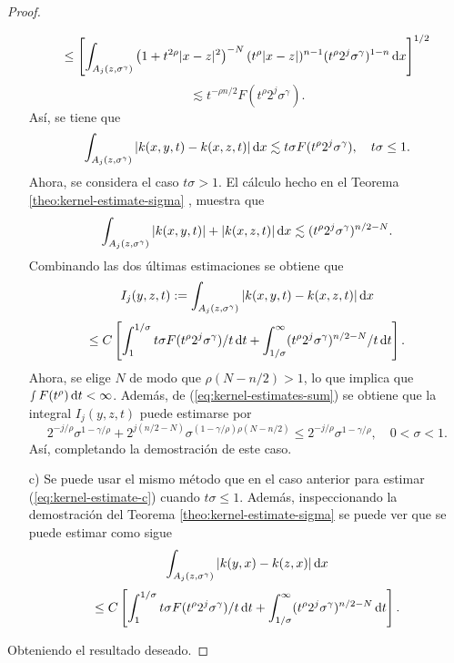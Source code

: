 \begin{proof}
\begin{itemize}
\begin{equation*}
			\leq \left[ \int_{A_j(z, \sigma^\gamma)} \left(1 + t^{2\rho} |x-z|^2\right)^{-N} (t^\rho|x-z|)^{n-1} (t^\rho 2^j \sigma^\gamma)^{1-n} \mathop{}\!\mathrm{d} x  \right]^{1/2}
		\end{equation*}
		\begin{equation*}
			\lesssim t^{-\rho n/2} F(t^\rho2^j\sigma^\gamma).
		\end{equation*}
		Así, se tiene que 
		\begin{equation*}
			\int_{A_j(z, \sigma^\gamma)} |k(x, y, t) - k(x, z, t)| \mathop{}\!\mathrm{d} x \lesssim t\sigma F(t^\rho 2^j\sigma^\gamma), \quad t\sigma \leq 1.
		\end{equation*}
		Ahora, se considera el caso $t\sigma>1$. El cálculo hecho en el Teorema \ref{theo:kernel-estimate-sigma} , muestra que 
		\begin{equation*}
			\int_{A_j(z, \sigma^\gamma)} |k(x, y, t)| + |k(x, z, t)| \mathop{}\!\mathrm{d} x \lesssim (t^\rho 2^j \sigma^\gamma )^{n/2 - N}.
		\end{equation*} 
		Combinando las dos últimas estimaciones se obtiene que 
		\begin{equation*}
			I_{j}(y, z, t) := \int_{A_j(z, \sigma^\gamma)} |k(x, y, t)-k(x, z, t)| \mathop{}\!\mathrm{d} x 
		\end{equation*}
		\begin{equation}
			\leq 
			C \left[  \int_1^{1/\sigma} t\sigma F(t^\rho 2^j \sigma^\gamma )/t\mathop{}\!\mathrm{d} t + \int_{1/\sigma}^\infty (t^\rho 2^j \sigma^\gamma )^{n/2 - N}/t \mathop{}\!\mathrm{d} t \right].
			\label{eq:kernel-estimates-sum}
		\end{equation}
		Ahora, se elige $N$ de modo que $\rho(N-n/2)>1$, lo que implica que $\smallint F(t^\rho)\mathop{}\!\mathrm{d} t < \infty$. Además, de (\ref{eq:kernel-estimates-sum}) se obtiene que la integral $I_j(y, z, t)$ puede estimarse por
		\begin{equation*}
			  2^{-j/\rho} \sigma^{1-\gamma/\rho} + 2^{j(n/2 -N)} \sigma^{(1-\gamma/\rho)\rho(N-n/2)} 
			  \leq 2^{-j/\rho} \sigma^{1-\gamma/\rho}, \quad 0<\sigma<1.
		\end{equation*}
		Así, completando la demostración de este caso. 
		\item[c)] Se puede usar el mismo método que en el caso anterior para estimar (\ref{eq:kernel-estimate-c}) cuando $t\sigma\leq1$. Además, inspeccionando la demostración del Teorema \ref{theo:kernel-estimate-sigma} se puede ver que se puede estimar como sigue 
		\begin{equation*}
			\int_{A_j(z, \sigma^\gamma)} |k(y, x) - k(z, x)|\mathop{}\!\mathrm{d} x  
		\end{equation*}
		\begin{equation*}
			\leq C \left[  \int_1^{1/\sigma} t\sigma F(t^\rho 2^j \sigma^\gamma )/t\mathop{}\!\mathrm{d} t + \int_{1/\sigma}^\infty (t^\rho2^j\sigma^\gamma)^{n/2 - N} \mathop{}\!\mathrm{d} t   \right].
		\end{equation*}        
	\end{itemize}
	Obteniendo el resultado deseado.
\end{proof}
